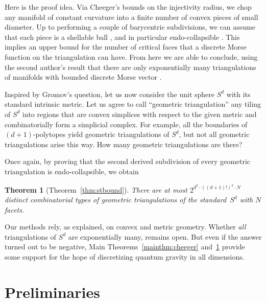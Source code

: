 \documentclass[a4paper,11pt]{article}
\theoremstyle{plain}
\newtheorem{thmnonumber}{\bf Theorem}
\theoremstyle{definition}
\begin{document}
Here is the proof idea. Via Cheeger's bounds on the injectivity radius, we chop any manifold of constant curvature into a finite number of convex pieces of small diameter. Up to performing a couple of barycentric subdivisions, we can assume that each piece is a shellable ball \cite{AB-Combinatorica}, and in particular endo-collapsible \cite{Benedetti-DMT4MWB}. This implies an upper bound for the number of critical faces that a discrete Morse function on the triangulation can have. From here we are able to conclude, using the second author's result that there are only exponentially many triangulations of manifolds with bounded discrete Morse vector \cite{Benedetti-DMT4MWB}.


Inspired by Gromov's question, let us now consider the unit sphere $S^d$ with its standard intrinsic metric. Let us agree to call ``geometric triangulation'' any tiling of $S^d$ into regions that are convex simplices with respect to the given metric and combinatorially form a simplicial complex. For example, all the boundaries of $(d+1)$-polytopes yield geometric triangulations of $S^d$, but not all geometric triangulations arise this way. How many geometric triangulations are there?

Once again, by proving that the second derived subdivision of every geometric triangulation is endo-collapsible, we obtain

\begin{thmnonumber}[Theorem~\ref{thm:stbound}]\label{mainthm:Gromov} 
There are at most $2^{d^2\cdot ((d+1)!)^2 \cdot N}$ distinct combinatorial types of geometric triangulations of the standard~$S^d$ with $N$ facets.
\end{thmnonumber}

Our methods rely, as explained, on convex and metric geometry. Whether \emph{all} triangulations of $S^d$ are exponentially many, remains open. But even if the answer turned out to be negative, Main Theorems~\ref{mainthm:cheeger} and~\ref{mainthm:Gromov} provide some support for the hope of discretizing quantum gravity in all dimensions.


\section*{Preliminaries}%
\end{document}
